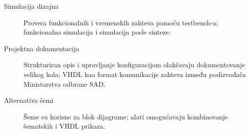 \begin{frame}[label=07-s017]
\begin{description}
\item[Simulacija dizajna] Provera funkcionalnih i vremenskih zahteva pomoću testbench-a; funkcionalna simulacija i simulacija posle sinteze.
\item[Projektna dokumentacija] Strukturiran opis i upravljanje konfiguracijom olakšavaju dokumentovanje velikog kola; VHDL kao format komunikacije zahteva između podizvođača Ministarstva odbrane SAD.
\item[Alternativa šemi] Šeme su korisne za blok dijagrame; alati omogućavaju kombinovanje šematskih i VHDL prikaza.
\end{description}
\end{frame}
